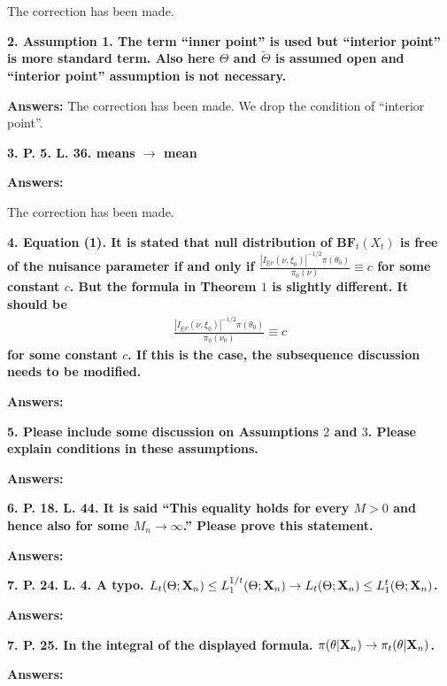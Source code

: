 \documentclass[11pt]{article}
\theoremstyle{plain}
\theoremstyle{definition}
\theoremstyle{remark}
\begin{document}
The correction has been made.

\textbf{
2. Assumption 1. The term ``inner point'' is used but ``interior point'' is more standard term.
Also here $\Theta$ and $\tilde \Theta$ is assumed open and ``interior point'' assumption is not necessary.
}

\textbf{Answers:}
The correction has been made.
We drop the condition of ``interior point''.

\textbf{
    3. P. 5. L. 36. means $\rightarrow$ mean
}

\textbf{Answers:}

The correction has been made.



\textbf{
4.
Equation (1).
It is stated that null distribution of $\textbf{BF}_t(X_t)$ is free of the nuisance parameter if and only if $\frac{\left| I_{\xi | \nu} (\nu, \xi_0) \right|^{-1/2} \pi(\theta_0) }{\pi_0(\nu)} \equiv c$ for some constant $c$. But the formula in Theorem $1$ is slightly different.
It should be
\begin{align*}
\frac{\left| I_{\xi | \nu} (\nu, \xi_0) \right|^{-1/2} \pi(\theta_0) }{\pi_0(\nu_0)} \equiv c
\end{align*}
for some constant $c$.
If this is the case, the subsequence discussion needs to be modified.
}

\textbf{Answers:}


\textbf{
5.
Please include some discussion on Assumptions $2$ and $3$.
Please explain conditions in these assumptions.
}


\textbf{Answers:}



\textbf{
6.
P. 18. L. 44.
It is said ``This equality holds for every $M>0$ and hence also for some $M_n \to \infty$.''
Please prove this statement.
}


\textbf{Answers:}



\textbf{
7.
P. 24. L. 4.
A typo.
$L_t (\Theta ; \mathbf{X}_n) \leq L_1^{1/t}(\Theta ; \mathbf{X}_n) \rightarrow  L_t (\Theta ; \mathbf{X}_n) \leq L_1^{t}(\Theta ; \mathbf{X}_n) $.
}


\textbf{Answers:}



\textbf{
7.
P. 25.
In the integral of the displayed formula. $\pi(\theta | \mathbf{X}_n) \rightarrow \pi_t (\theta | \mathbf{X}_n)$.
}


\textbf{Answers:}
\end{document}
